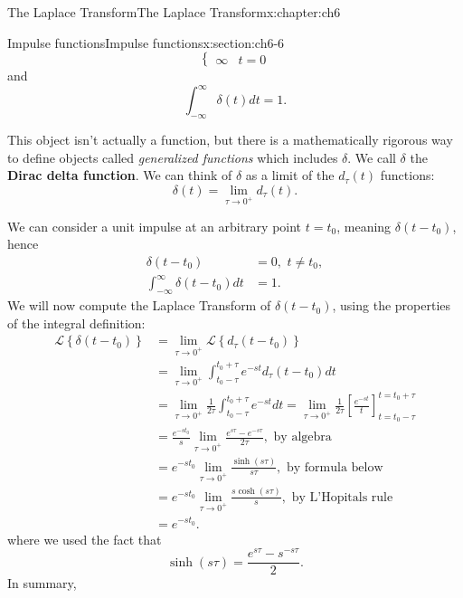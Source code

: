 \documentclass[oneside,10pt,]{book}
\newcommand{\terminology}[1]{\textbf{#1}}
\numberwithin{equation}{section}
\numberwithin{equation}{section}
\newcommand{\amp}{&}
\begin{document}
\begin{chapterptx}{The Laplace Transform}{}{The Laplace Transform}{}{}{x:chapter:ch6}
\begin{sectionptx}{Impulse functions}{}{Impulse functions}{}{}{x:section:ch6-6}
\begin{equation*}
\begin{cases}
\infty \amp t=0
\end{cases}
\end{equation*}
and%
\begin{equation*}
\int_{-\infty}^{\infty}\delta(t)dt=1.
\end{equation*}
%
\par
This object isn't actually a function, but there is a mathematically rigorous way to define objects called \emph{generalized functions} which includes \(\delta\). We call \(\delta\) the \terminology{Dirac delta function}. We can think of \(\delta\) as a limit of the \(d_{\tau}(t)\) functions:%
\begin{equation*}
\delta(t)=\lim_{\tau\to0^{+}}d_{\tau}(t).
\end{equation*}
%
\par
We can consider a unit impulse at an arbitrary point \(t=t_{0}\), meaning \(\delta\left(t-t_{0}\right)\), hence%
\begin{align*}
\delta\left(t-t_{0}\right) \amp =0,\,\,t\neq t_{0},\\
\int_{-\infty}^{\infty}\delta(t-t_{0})dt \amp =1.
\end{align*}
We will now compute the Laplace Transform of \(\delta\left(t-t_{0}\right)\), using the properties of the integral definition:%
\begin{align*}
\mathcal{L}\left\{ \delta\left(t-t_{0}\right)\right\}  \amp =\lim_{\tau\to0^{+}}\mathcal{L}\left\{ d_{\tau}\left(t-t_{0}\right)\right\} \\
\amp =\lim_{\tau\to0^{+}}\int_{t_{0}-\tau}^{t_{0}+\tau}e^{-st}d_{\tau}\left(t-t_{0}\right)dt\\
\amp =\lim_{\tau\to0^{+}}\frac{1}{2\tau}\int_{t_{0}-\tau}^{t_{0}+\tau}e^{-st}dt=\lim_{\tau\to0^{+}}\frac{1}{2\tau}\left[\frac{e^{-st}}{t}\right]_{t=t_{0}-\tau}^{t=t_{0}+\tau}\\
\amp =\frac{e^{-st_{0}}}{s}\lim_{\tau\to0^{+}}\frac{e^{s\tau}-e^{-s\tau}}{2\tau},\text{ by algebra}\\
\amp =e^{-st_{0}}\lim_{\tau\to0^{+}}\frac{\sinh(s\tau)}{s\tau},\text{ by formula below}\\
\amp =e^{-st_{0}}\lim_{\tau\to0^{+}}\frac{s\cosh(s\tau)}{s},\text{ by L'Hopitals rule}\\
\amp =e^{-st_{0}}.
\end{align*}
where we used the fact that%
\begin{equation*}
\sinh(s\tau)=\frac{e^{s\tau}-s^{-s\tau}}{2}.
\end{equation*}
In summary,%
\begin{equation*}

\end{equation*}
\end{sectionptx}
\end{chapterptx}
\end{document}
